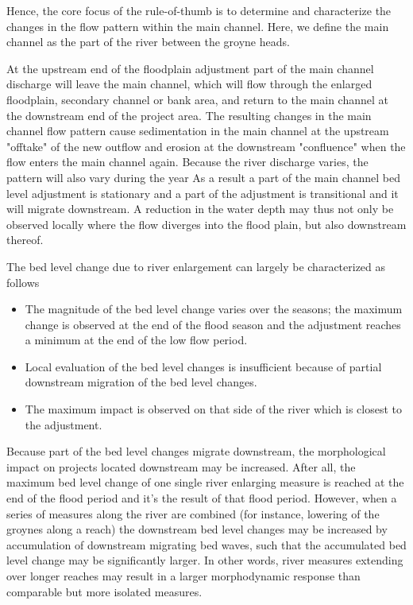 Hence, the core focus of the rule-of-thumb is to determine and characterize the changes in the flow pattern within the main channel.
Here, we define the main channel as the part of the river between the groyne heads.

At the upstream end of the floodplain adjustment part of the main channel discharge will leave the main channel, which will flow through the enlarged floodplain, secondary channel or bank area, and return to the main channel at the downstream end of the project area.
The resulting changes in the main channel flow pattern cause sedimentation in the main channel at the upstream "offtake" of the new outflow and erosion at the downstream "confluence" when the flow enters the main channel again.
Because the river discharge varies, the pattern will also vary during the year
As a result a part of the main channel bed level adjustment is stationary and a part of the adjustment is transitional and it will migrate downstream.
A reduction in the water depth may thus not only be observed locally where the flow diverges into the flood plain, but also downstream thereof.

The bed level change due to river enlargement can largely be characterized as follows

\begin{itemize}
\item The magnitude of the bed level change varies over the seasons; the maximum change is observed at the end of the flood season and the adjustment reaches a minimum at the end of the low flow period.

\item Local evaluation of the bed level changes is insufficient because of partial downstream migration of the bed level changes.

\item The maximum impact is observed on that side of the river which is closest to the adjustment.
\end{itemize}

Because part of the bed level changes migrate downstream, the morphological impact on projects located downstream may be increased.
After all, the maximum bed level change of one single river enlarging measure is reached at the end of the flood period and it's the result of that flood period.
However, when a series of measures along the river are combined (for instance, lowering of the groynes along a reach) the downstream bed level changes may be increased by accumulation of downstream migrating bed waves, such that the accumulated bed level change may be significantly larger.
In other words, river measures extending over longer reaches may result in a larger morphodynamic response than comparable but more isolated measures.

